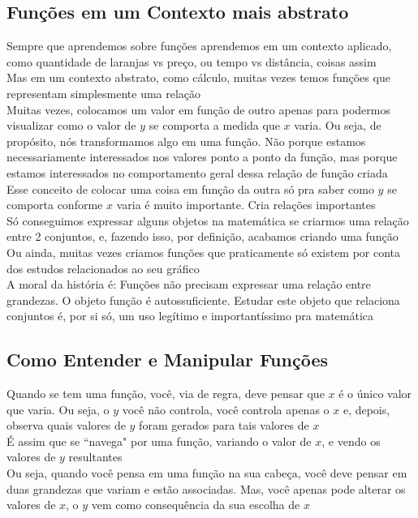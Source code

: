\documentclass{article}
\begin{document}
\subsection{Funções em um Contexto mais abstrato}
Sempre que aprendemos sobre funções aprendemos em um contexto aplicado, como quantidade de laranjas vs preço, ou tempo vs distância, coisas assim
\\[2pt]
Mas em um contexto abstrato, como cálculo, muitas vezes temos funções que representam simplesmente uma relação
\\[5pt]
Muitas vezes, colocamos um valor em função de outro apenas para podermos visualizar como o valor de $y$ se comporta a medida que $x$ varia. Ou seja, de propósito, nós transformamos algo em uma função. Não porque estamos necessariamente interessados nos valores ponto a ponto da função, mas porque estamos interessados no comportamento geral dessa relação de função criada
\\[5pt]
Esse conceito de colocar uma coisa em função da outra só pra saber como $y$ se comporta conforme $x$ varia é muito importante. Cria relações importantes
\\[2pt]
Só conseguimos expressar alguns objetos na matemática se criarmos uma relação entre 2 conjuntos, e, fazendo isso, por definição, acabamos criando uma função
\\[5pt]
Ou ainda, muitas vezes criamos funções que praticamente só existem por conta dos estudos relacionados ao seu gráfico
\\[5pt]
A moral da história é: Funções não precisam expressar uma relação entre grandezas. O objeto função é autossuficiente. Estudar este objeto que relaciona conjuntos é, por si só, um uso legítimo e importantíssimo pra matemática

\subsection{Como Entender e Manipular Funções}
Quando se tem uma função, você, via de regra, deve pensar que $x$ é o único valor que varia. Ou seja, o $y$ você não controla, você controla apenas o $x$ e, depois, observa quais valores de $y$ foram gerados para tais valores de $x$
\\[2pt]
É assim que se ``navega" por uma função, variando o valor de $x$, e vendo os valores de $y$ resultantes
\\[5pt]
Ou seja, quando você pensa em uma função na sua cabeça, você deve pensar em duas grandezas que variam e estão associadas. Mas, você apenas pode alterar os valores de $x$, o $y$ vem como consequência da sua escolha de $x$
\end{document}
